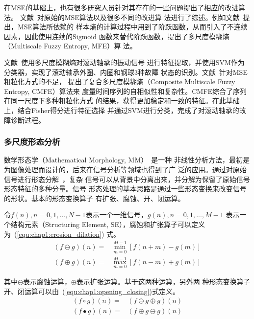 在MSE的基础上，也有很多研究人员针对其存在的一些问题提出了相应的改进算法。
文献~对原始的MSE算法以及很多不同的改进算
法进行了综述。例如文献~提出，MSE算法所依赖的
样本熵的计算过程中用到了阶跃函数，从而引入了不连续因素，因此使用连续的Sigmoid
函数来替代阶跃函数，提出了多尺度模糊熵（Multiscale Fuzzy Entropy, MFE）算
法。

文献~使用多尺度模糊熵对滚动轴承的振动信号
进行特征提取，并使用SVM作为分类器，实现了滚动轴承外圈、内圈和钢球3种故障
状态的识别。文献~针对MSE粗粒化方式的不足，
提出了复合多尺度模糊熵（Composite Multiscale Fuzzy Entropy, CMFE）算法来
度量时间序列的自相似性和复杂性。CMFE综合了序列在同一尺度下多种粗粒化方式
的结果，获得更加稳定和一致的特征。在此基础上，结合Fisher得分进行特征选择
并通过SVM进行分类，完成了对滚动轴承的故障诊断过程。

\subsubsection{多尺度形态分析}

数学形态学（Mathematical Morphology, MM）~\cite{haralick1987image}是一种
非线性分析方法，最初是为图像处理而设计的，后来在信号分析等领域也得到了广
泛的应用。通过对原始信号进行形态分解~\cite{pitas1990morphological}，复杂
信号可以从背景中分离出来，并分解为保留了原始信号形态特征的多种分量。信号
形态处理的基本思路是通过一些形态变换来改变信号的形状。基本的形态变换算子
有扩张、腐蚀、开、闭运算。

令$f(n), n={0, 1, ..., N-1}$表示一个一维信号，$g(n), n={0, 1, ..., M-1}$
表示一个结构元素（Structuring Element, SE），腐蚀和扩张算子可以定义为~(\ref{equ:chap1:erosion_dilation})
式。
\begin{equation}
  \label{equ:chap1:erosion_dilation}
  \begin{aligned}
    (f\ominus g)(n) = & \min_{m=0}^{M-1}\left[f(n+m)-g(m)\right] \\
    (f\oplus g)(n) = & \max_{m=0}^{M-1}\left[f(n-m)+g(m)\right]
  \end{aligned}
\end{equation}

其中$\ominus$表示腐蚀运算，$\oplus$表示扩张运算。基于这两种运算，另外两
种形态变换算子开、闭运算可以由~(\ref{equ:chap1:opening_closing})式定义。
\begin{equation}
  \label{equ:chap1:opening_closing}
  \begin{aligned}
    (f\circ g)(n) = & (f\ominus g\oplus g)(n) \\
    (f\bullet g)(n) = & (f\oplus g\ominus g)(n)
  \end{aligned}
\end{equation}

